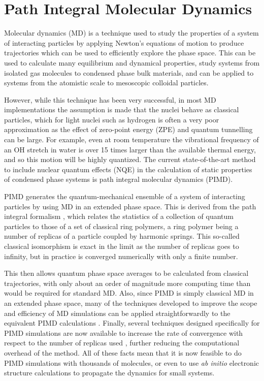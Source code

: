 \documentclass[11pt,english,fleqn]{report}
\begin{document}
\section{Path Integral Molecular Dynamics}

Molecular dynamics (MD) is a technique used to study the properties
of a system of interacting particles by applying Newton's equations
of motion to produce trajectories which can be used to efficiently
explore the phase space. This can be used to calculate many equilibrium
and dynamical properties, study systems from isolated gas molecules
to condensed phase bulk materials, and can be applied to systems from
the atomistic scale to mesoscopic colloidal particles.

However, while this technique has been very successful, in most MD
implementations the assumption is made that the nuclei behave as classical
particles, which for light nuclei such as hydrogen is often a very
poor approximation as the effect of zero-point energy (ZPE) and quantum
tunnelling can be large. For example, even at room temperature the
vibrational frequency of an OH stretch in water is over 15 times larger
than the available thermal energy, and so this motion will be highly
quantized. The current state-of-the-art method to include nuclear
quantum effects (NQE) in the calculation of static properties of condensed
phase systems is path integral molecular dynamics (PIMD).

PIMD generates the quantum-mechanical ensemble of a system of interacting
particles by using MD in an extended phase space. This is derived
from the path integral formalism \cite{feyn-hibb65book}, which
relates the statistics of a collection of quantum particles to those
of a set of classical ring polymers, a ring polymer being a number
of replicas of a particle coupled by harmonic springs. This so-called
classical isomorphism is exact in the limit as the number of replicas
goes to infinity, but in practice is converged numerically with only
a finite number.

This then allows quantum phase space averages to be calculated from
classical trajectories, with only about an order of magnitude more
computing time than would be required for standard MD. Also, since
PIMD is simply classical MD in an extended phase space, many of the
techniques developed to improve the scope and efficiency of MD simulations
can be applied straightforwardly to the equivalent PIMD calculations
\cite{ceri+10jcp,mart+99jcp}. Finally, several techniques designed
specifically for PIMD simulations are now available to increase the
rate of convergence with respect to the number of replicas used \cite{mark-mano08jcp,ceri+11jcp},
further reducing the computational overhead of the method. All
of these facts mean that it is now feasible to do PIMD simulations
with thousands of molecules, or even to use \emph{ab initio} electronic
structure calculations to propagate the dynamics for small systems.
\end{document}
